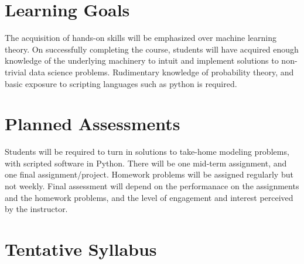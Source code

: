 \documentclass[10pt,onecolumn,compsoc]{IEEEtran}
\begin{document}
\section*{Learning Goals}

The  acquisition of hands-on skills will be emphasized over machine learning theory. On successfully completing the course, students will   have acquired enough knowledge of the underlying machinery to intuit and implement solutions to  non-trivial data science problems. Rudimentary knowledge of probability theory, and basic exposure to scripting languages such as python is required. 

\section*{Planned Assessments}
Students will be required to turn in solutions to take-home modeling problems, with scripted software in Python.
There will be one mid-term assignment, and one final assignment/project. Homework problems will be assigned regularly but not weekly. Final assessment will depend on the performanace on  the assignments and the homework problems, and the level of engagement and interest perceived by the instructor.



\def\COLA{\color{gray}}
\def\COLB{\color{SeaGreen4}}

\section*{Tentative Syllabus}
\end{document}

